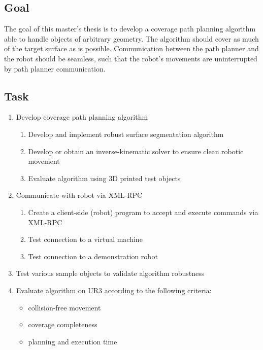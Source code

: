 \documentclass[a4paper, 10pt]{article}
\begin{document}
\begin{flushleft}
	\section*{Goal}
	The goal of this master's thesis is to develop a coverage path planning algorithm able to handle objects of arbitrary geometry.
	The algorithm should cover as much of the target surface as is possible.
	Communication between the path planner and the robot should be seamless, such that the robot's movements are uninterrupted by path planner communication.
\end{flushleft}
\begin{flushleft}
	\section*{Task}
	\begin{enumerate}
		\item Develop coverage path planning algorithm
		\begin{enumerate}
			\item Develop and implement robust surface segmentation algorithm
			\item Develop or obtain an inverse-kinematic solver to ensure clean robotic movement
			\item Evaluate algorithm using 3D printed test objects
		\end{enumerate}
		\item Communicate with robot via XML-RPC
		\begin{enumerate}
			\item Create a client-side (robot) program to accept and execute commands via XML-RPC
			\item Test connection to a virtual machine
			\item Test connection to a demonstration robot
		\end{enumerate}
		\item Test various sample objects to validate algorithm robustness
		\item Evaluate algorithm on UR3 according to the following criteria:
			\begin{itemize}
				\item collision-free movement
				\item coverage completeness
				\item planning and execution time
			\end{itemize}
	\end{enumerate}
\end{flushleft}
\printbibliography
\end{document}
